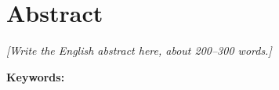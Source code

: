 
\chapter*{Abstract}

\textit{[Write the English abstract here, about 200–300 words.]}

\vspace{0.5cm}
\noindent\textbf{Keywords:} \keywords
